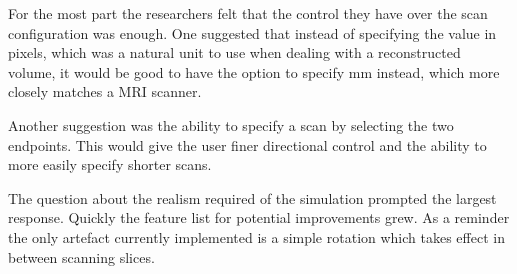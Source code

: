For the most part the researchers felt that the control they have over the scan configuration was enough. One suggested that instead of specifying the value in pixels, which was a natural unit to use when dealing with a reconstructed volume, it would be good to have the option to specify mm instead, which more closely matches a MRI scanner. 

Another suggestion was the ability to specify a scan by selecting the two endpoints. This would give the user finer directional control and the ability to more easily specify shorter scans.

The question about the realism required of the simulation prompted the largest response. Quickly the feature list for potential improvements grew. As a reminder the only artefact currently implemented is a simple rotation which takes effect in between scanning slices.

